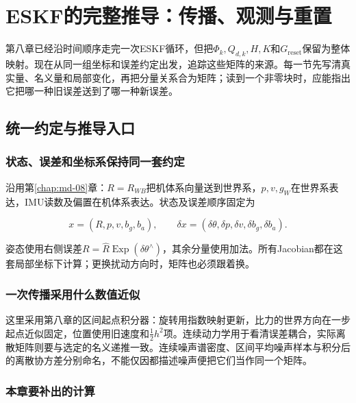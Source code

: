 \chapter{ESKF的完整推导：传播、观测与重置}

\label{chap:md-09}

第八章已经沿时间顺序走完一次ESKF循环，但把$\Phi_k,Q_{d,k},H,K$和$G_{\mathrm{reset}}$保留为整体映射。现在从同一组坐标和误差约定出发，追踪这些矩阵的来源。每一节先写清真实量、名义量和局部变化，再把分量关系合为矩阵；读到一个非零块时，应能指出它把哪一种旧误差送到了哪一种新误差。

\section{统一约定与推导入口}

\subsection{状态、误差和坐标系保持同一套约定}

沿用第\ref{chap:md-08}章：$R=R_{WB}$把机体系向量送到世界系，$p,v,g_W$在世界系表达，IMU读数及偏置在机体系表达。状态及误差顺序固定为

\begin{equation*}
x=(R,p,v,b_g,b_a),\qquad
\delta x=(\delta\theta,\delta p,\delta v,\delta b_g,\delta b_a).
\end{equation*}

姿态使用右侧误差$R=\hat R\operatorname{Exp}(\delta\theta^\wedge)$，其余分量使用加法。所有Jacobian都在这套局部坐标下计算；更换扰动方向时，矩阵也必须跟着换。

\subsection{一次传播采用什么数值近似}

这里采用第八章的区间起点积分器：旋转用指数映射更新，比力的世界方向在一步起点近似固定，位置使用旧速度和$\tfrac12 h^2$项。连续动力学用于看清误差耦合，实际离散矩阵则要与选定的名义递推一致。连续噪声谱密度、区间平均噪声样本与积分后的离散协方差分别命名，不能仅因都描述噪声便把它们当作同一个矩阵。

\subsection{本章要补出的计算}

